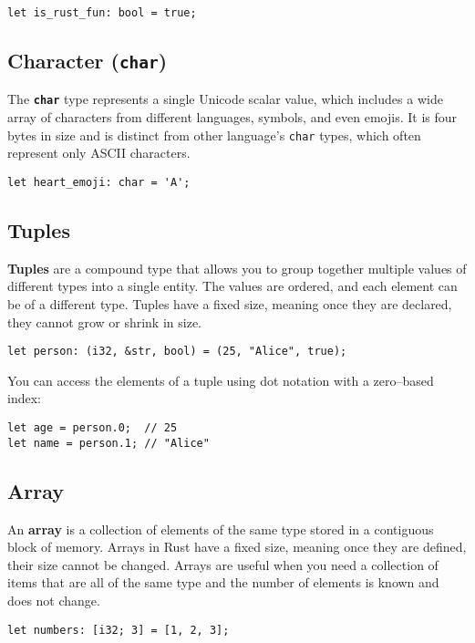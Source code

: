 \begin{lstlisting}
let is_rust_fun: bool = true;
\end{lstlisting}

\subsection{Character (\texttt{char})}
The \textbf{\texttt{char}} type represents a single Unicode scalar value, which includes a wide array of characters from different languages, symbols, and even emojis. It is four bytes in size and is distinct from other language's \texttt{char} types, which often represent only ASCII characters.

\begin{lstlisting}
let heart_emoji: char = 'A';
\end{lstlisting}

\subsection{Tuples}
\textbf{Tuples} are a compound type that allows you to group together multiple values of different types into a single entity. The values are ordered, and each element can be of a different type. Tuples have a fixed size, meaning once they are declared, they cannot grow or shrink in size.

\begin{lstlisting}
let person: (i32, &str, bool) = (25, "Alice", true);
\end{lstlisting}

You can access the elements of a tuple using dot notation with a zero--based index:

\begin{lstlisting}
let age = person.0;  // 25
let name = person.1; // "Alice"
\end{lstlisting}

\subsection{Array}
An \textbf{array} is a collection of elements of the same type stored in a contiguous block of memory. Arrays in Rust have a fixed size, meaning once they are defined, their size cannot be changed.
Arrays are useful when you need a collection of items that are all of the same type and the number of elements is known and does not change.

\begin{lstlisting}
let numbers: [i32; 3] = [1, 2, 3];
\end{lstlisting}

